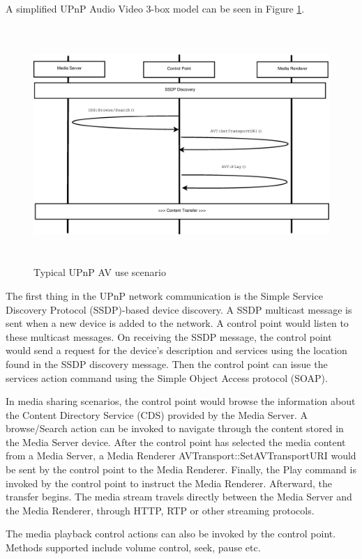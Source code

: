 A simplified UPnP Audio Video 3-box model \cite{DLNA_proxy} can be 
seen in Figure \ref{av_use_scenario}.
\begin{figure}[htb] 
\centering \includegraphics[height=9cm]{charts/chart1} 
\caption{Typical UPnP AV use scenario \label{av_use_scenario}} 
\end{figure} 
The first thing in the UPnP network communication is the Simple Service
Discovery Protocol (SSDP)-based device discovery. A SSDP multicast message is
sent when a new device is added to the network. A control point would listen to these 
multicast messages. On receiving the SSDP message, the control point would send a request for the device's description and services using the location found in the SSDP discovery message. Then the control point can issue the services action command using the Simple Object Access protocol (SOAP).

In media sharing scenarios, the control point would browse the information about 
the Content Directory Service (CDS) provided by the Media Server. A 
browse/Search action can be invoked to navigate through the content stored in 
the Media Server device. After the control point has selected the media content from 
a Media Server, a Media Renderer AVTransport::SetAVTransportURI would be sent by 
the control point to the Media Renderer. Finally, the Play command is invoked by 
the control point to instruct the Media Renderer. Afterward, the transfer begins. The media 
stream travels directly between the Media Server and the Media Renderer, through HTTP, 
RTP \cite{rtp_rfc} or other streaming protocols.

The media playback control actions can also be invoked by the control point. Methods 
supported include volume control, seek, pause etc. 

